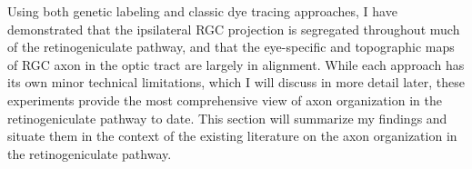 Using both genetic labeling and classic dye tracing approaches, I have demonstrated that the ipsilateral RGC projection is segregated throughout much of the retinogeniculate pathway, and that the eye-specific and topographic maps of RGC axon in the optic tract are largely in alignment.
While each approach has its own minor technical limitations, which I will discuss in more detail later, these experiments provide the most comprehensive view of axon organization in the retinogeniculate pathway to date.
This section will summarize my findings and situate them in the context of the existing literature on the axon organization in the retinogeniculate pathway.